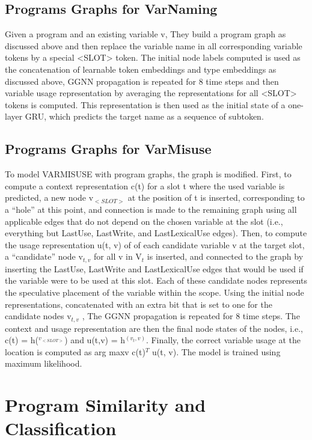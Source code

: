 \documentclass{article}
\begin{document}
\subsection{Programs Graphs for VarNaming}
Given a program and an existing variable v, They build a program graph as discussed above and then replace the variable name in all corresponding variable tokens by a special <SLOT> token. The initial node labels computed is used as the concatenation of learnable token embeddings and type embeddings as discussed above, GGNN propagation is repeated for 8 time steps and then variable usage representation by averaging the representations for all <SLOT> tokens is computed. This representation is then used as the initial state of a one-layer GRU, which predicts the target name as a sequence of subtoken.

\subsection{Programs Graphs for VarMisuse}
To model VARMISUSE with program graphs, the graph is modified. First, to compute a context representation c(t) for a slot t where the used variable is predicted, a new node v$_{<SLOT>}$ at the position of t is inserted, corresponding to a “hole” at this point, and connection is made to the remaining graph using all applicable edges that do not depend on the chosen variable at the slot (i.e., everything but LastUse, LastWrite, and LastLexicalUse edges). Then, to compute the usage representation u(t, v) of of each candidate variable v at the target slot, a “candidate” node v$_{t,v}$ for all v in V$_t$ is inserted, and connected to the graph by inserting the LastUse, LastWrite and LastLexicalUse edges that would be used if the variable were to be used at this slot. Each of these candidate nodes represents the speculative placement of the variable within the scope.
Using the initial node representations, concatenated with an extra bit that is set to one for the candidate nodes v$_{t,v}$ , The GGNN propagation is repeated for 8 time steps. The context and usage representation are then the final node states of the nodes, i.e., c(t) = h($^{v_{<SLOT>}}$) and u(t,v) = h$^{(v_t,v)}$. Finally, the correct variable usage at the location is computed as arg maxv c(t)$^T$ u(t, v). The model is trained using maximum likelihood.

\section{Program Similarity and Classification}
\label{similarity}
\end{document}
